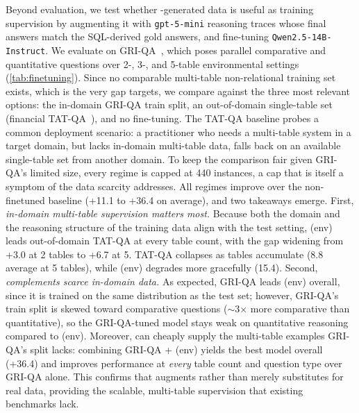 Beyond evaluation, we test whether \name-generated data is useful as training supervision by augmenting it with \texttt{gpt-5-mini} reasoning traces whose final answers match the SQL-derived gold answers, and fine-tuning \texttt{Qwen2.5-14B-Instruct}. 
We evaluate on GRI-QA~\cite{1.16}, which poses parallel comparative and quantitative questions over 2-, 3-, and 5-table environmental settings (\autoref{tab:finetuning}).
Since no comparable multi-table non-relational training set exists, which is the very gap \name targets, we compare against the three most relevant options: the in-domain GRI-QA train split, an out-of-domain single-table set (financial TAT-QA~\citealp{1.9}), and no fine-tuning. The TAT-QA baseline probes a common deployment scenario: a practitioner who needs a multi-table system in a target domain, but lacks in-domain multi-table data, falls back on an available single-table set from another domain. To keep the comparison fair given GRI-QA's limited size, every regime is capped at 440 instances, a cap that is itself a symptom of the data scarcity \name addresses.
All regimes improve over the non-finetuned baseline (+11.1 to +36.4 on average), and two takeaways emerge. First, \emph{in-domain multi-table supervision matters most.} Because both the domain and the reasoning structure of the training data align with the test setting, \name (env) leads out-of-domain TAT-QA at every table count, with the gap widening from +3.0 at 2 tables to +6.7 at 5. TAT-QA collapses as tables accumulate (8.8 average at 5 tables), while \name (env) degrades more gracefully (15.4). Second, \emph{\name complements scarce in-domain data.} As expected, GRI-QA leads \name (env) overall, since it is trained on the same distribution as the test set; however, GRI-QA's train split is skewed toward comparative questions ($\sim$3$\times$ more comparative than quantitative), so the GRI-QA-tuned model stays weak on quantitative reasoning compared to \name (env). Moreover, \name can cheaply supply the multi-table examples GRI-QA's split lacks: combining GRI-QA + \name (env) yields the best model overall (+36.4) and improves performance at \emph{every} table count and question type over GRI-QA alone. This confirms that \name augments rather than merely substitutes for real data, providing the scalable, multi-table supervision that existing benchmarks lack.

